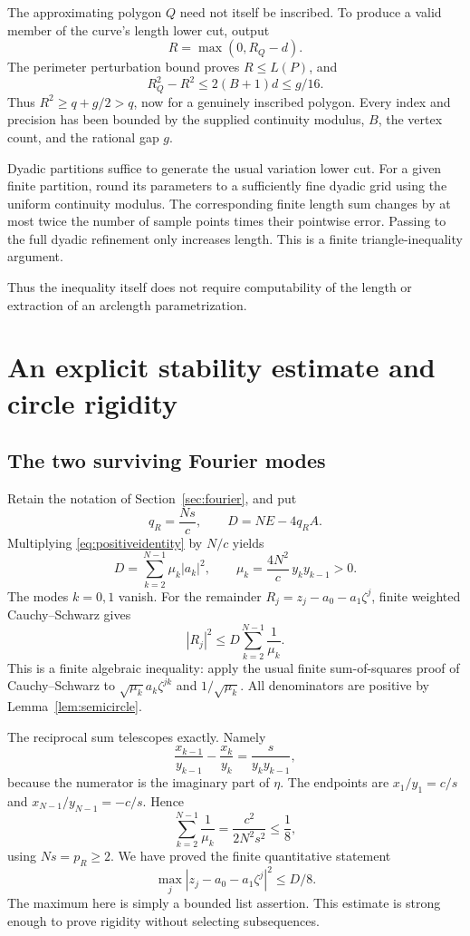 \documentclass[11pt,a4paper]{article}
\theoremstyle{definition}
\begin{document}
The approximating polygon \(Q\) need not itself be inscribed.
To produce a valid member of the curve's length lower cut, output
\[
 R=\max(0,R_Q-d).
\]
The perimeter perturbation bound proves \(R\le L(P)\), and
\[
 R_Q^2-R^2\le2(B+1)d\le g/16.
\]
Thus \(R^2\ge q+g/2>q\), now for a genuinely inscribed polygon.
Every index and precision has been bounded by the supplied continuity
modulus, \(B\), the vertex count, and the rational gap \(g\).

Dyadic partitions suffice to generate the usual variation lower cut.
For a given finite partition, round its parameters to a sufficiently
fine dyadic grid using the uniform continuity modulus. The corresponding
finite length sum changes by at most twice the number of sample points
times their pointwise error. Passing to the full dyadic refinement
only increases length. This is a finite triangle-inequality argument.

Thus the inequality itself does not require computability of the
length or extraction of an arclength parametrization.

\section{An explicit stability estimate and circle rigidity}
\label{sec:rigidity}
\subsection{The two surviving Fourier modes}
Retain the notation of Section~\ref{sec:fourier}, and put
\[
 q_R=\frac{Ns}{c},\qquad
 D=NE-4q_RA.
\]
Multiplying \eqref{eq:positiveidentity} by \(N/c\) yields
\[
 D=\sum_{k=2}^{N-1}\mu_k|a_k|^2,\qquad
 \mu_k=\frac{4N^2}{c}\,y_ky_{k-1}>0.
 \tag{10.1}\label{eq:stabilityspectral}
\]
The modes \(k=0,1\) vanish. For the remainder
\(R_j=z_j-a_0-a_1\zeta^j\), finite weighted Cauchy--Schwarz gives
\[
 |R_j|^2\le D\sum_{k=2}^{N-1}\frac1{\mu_k}.
 \tag{10.2}\label{eq:weightedcauchy}
\]
This is a finite algebraic inequality: apply the usual finite
sum-of-squares proof of Cauchy--Schwarz to
\(\sqrt{\mu_k}a_k\zeta^{jk}\) and \(1/\sqrt{\mu_k}\).
All denominators are positive by Lemma~\ref{lem:semicircle}.

The reciprocal sum telescopes exactly. Namely
\[
 \frac{x_{k-1}}{y_{k-1}}-\frac{x_k}{y_k}
 =\frac{s}{y_ky_{k-1}},
\]
because the numerator is the imaginary part of \(\eta\).
The endpoints are \(x_1/y_1=c/s\) and
\(x_{N-1}/y_{N-1}=-c/s\). Hence
\[
 \sum_{k=2}^{N-1}\frac1{\mu_k}
 =\frac{c^2}{2N^2s^2}\le\frac18,
 \tag{10.3}\label{eq:reciprocal}
\]
using \(Ns=p_R\ge2\). We have proved the finite quantitative statement
\[
 \boxed{\max_j|z_j-a_0-a_1\zeta^j|^2\le D/8.}
 \tag{10.4}\label{eq:stability}
\]
The maximum here is simply a bounded list assertion. This estimate is
strong enough to prove rigidity without selecting subsequences.
\end{document}
